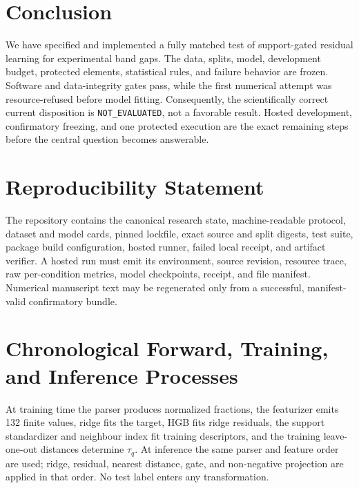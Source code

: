 \documentclass[11pt]{article}
\begin{document}
\section{Conclusion}
We have specified and implemented a fully matched test of support-gated residual
learning for experimental band gaps. The data, splits, model, development
budget, protected elements, statistical rules, and failure behavior are frozen.
Software and data-integrity gates pass, while the first numerical attempt was
resource-refused before model fitting. Consequently, the scientifically correct
current disposition is \texttt{NOT\_EVALUATED}, not a favorable result. Hosted
development, confirmatory freezing, and one protected execution are the exact
remaining steps before the central question becomes answerable.

\section*{Reproducibility Statement}
The repository contains the canonical research state, machine-readable protocol,
dataset and model cards, pinned lockfile, exact source and split digests, test
suite, package build configuration, hosted runner, failed local receipt, and
artifact verifier. A hosted run must emit its environment, source revision,
resource trace, raw per-condition metrics, model checkpoints, receipt, and file
manifest. Numerical manuscript text may be regenerated only from a successful,
manifest-valid confirmatory bundle.




\appendix
\section{Chronological Forward, Training, and Inference Processes}
At training time the parser produces normalized fractions, the featurizer emits
132 finite values, ridge fits the target, HGB fits ridge residuals, the support
standardizer and neighbour index fit training descriptors, and the training
leave-one-out distances determine $\tau_q$. At inference the same parser and
feature order are used; ridge, residual, nearest distance, gate, and non-negative
projection are applied in that order. No test label enters any transformation.
\end{document}
